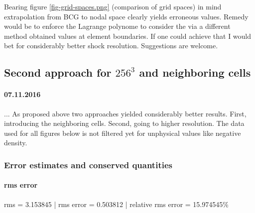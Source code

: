 

Bearing figure \ref{fig-grid-spaces.png} (comparison of grid spaces) in mind
extrapolation from BCG to nodal space clearly yields erroneous values.  Remedy
would be to enforce the Lagrange polynome to consider the via a different
method obtained values at element boundaries. If one could achieve that I would
bet for considerably better shock resolution. Suggestions are welcome.

\subsection{Second approach for $256^3$ and neighboring cells}

\paragraph{07.11.2016} ...
As proposed above two approaches yielded considerably better results. First,
introducing the neighboring cells. Second, going to higher resolution. The data
used for all figures below is not filtered yet for unphysical values like
negative density.




\subsubsection{Error estimates and conserved quantities}

\paragraph{rms error}
rms = 3.153845 | rms error = 0.503812 | relative rms error = 15.974545\%

